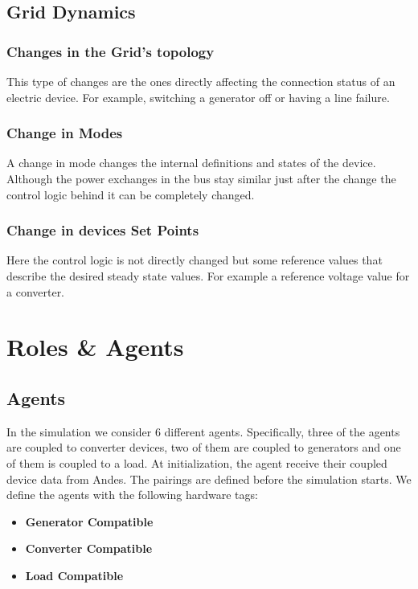 \documentclass{article}
\begin{document}
\subsection{Grid Dynamics}

\subsubsection*{Changes in the Grid's topology}

This type of changes are the ones directly affecting the connection status of an electric device. For example, switching a generator off or having a line failure.

\subsubsection*{Change in Modes}
A change in mode changes the internal definitions and states of the device. Although the power exchanges in the bus stay similar just after the change the control logic behind it can be completely changed.

\subsubsection*{Change in devices Set Points}

Here the control logic is not directly changed but some reference values that describe the desired steady state values. For example a reference voltage value for a converter.

\section{Roles \& Agents}


\subsection{Agents}
In the simulation we consider 6 different agents. Specifically, three of the agents are coupled to converter devices, two of them are coupled to generators and one of them is coupled to a load. At initialization, the agent receive their coupled device data from Andes. The pairings are defined before the simulation starts. We define the agents with the following hardware tags:

\begin{itemize}
    \item \textbf{Generator Compatible}
    \item \textbf{Converter Compatible}
    \item \textbf{Load Compatible}
\end{itemize}
\end{document}
